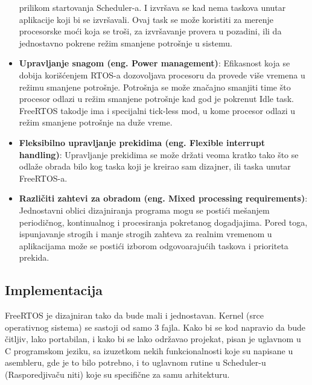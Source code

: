 \documentclass[a4paper,12pt, master]{etf}
\begin{document}
\begin{itemize}
        prilikom startovanja Scheduler-a. I izvr\v{s}ava se kad nema taskova
        unutar aplikacije koji bi se izvr\v{s}avali. Ovaj task se mo\v{z}e
        koristiti za merenje procesorske mo\'{c}i koja se tro\v{s}i, za
        izvr\v{s}avanje provera u pozadini, ili da jednostavno pokrene re\v{z}im
        smanjene potro\v{s}nje u sistemu.
        \item \textbf{Upravljanje snagom (eng\@. Power management)}: Efikasnost koja se
        dobija kori\v{s}\'{c}enjem RTOS-a dozovoljava procesoru da provede
        vi\v{s}e vremena u re\v{z}imu smanjene potro\v{s}nje. Potro\v{s}nja se
        mo\v{z}e zna\v{c}ajno smanjiti time \v{s}to procesor odlazi u re\v{z}im
        smanjene potro\v{s}nje kad god je pokrenut Idle task. FreeRTOS takodje
        ima i specijalni tick-less mod, u kome procesor odlazi u re\v{z}im
        smanjene potro\v{s}nje na du\v{z}e vreme.
        \item \textbf{Fleksibilno upravljanje prekidima (eng\@. Flexible interrupt
        handling)}: Upravljanje prekidima se mo\v{z}e dr\v{z}ati veoma kratko
        tako \v{s}to se odla\v{z}e obrada bilo kog taska koji je kreirao sam
        dizajner, ili taska unutar FreeRTOS-a.
        \item \textbf{Razli\v{c}iti zahtevi za obradom (eng\@. Mixed processing
        requirements)}: Jednostavni oblici dizajniranja programa mogu se
        posti\'{c}i me\v{s}anjem periodi\v{c}nog, kontinualnog i procesiranja
        pokretanog dogadjajima. Pored toga, ispunjavanje strogih i manje strogih
        zahteva za realnim vremenom u aplikacijama mo\v{z}e se posti\'{c}i
        izborom odgovoaraju\'{c}ih taskova i prioriteta prekida.

	\end{itemize}

	\subsection{Implementacija}

	FreeRTOS je dizajniran tako da bude mali i jednostavan. Kernel (srce
	operativnog sistema) se sastoji od samo 3 fajla. Kako bi se kod napravio da
	bude \v{c}itljiv, lako portabilan, i kako bi se lako odr\v{z}avao projekat,
	pisan je uglavnom u C programskom jeziku, sa izuzetkom nekih
	funkcionalnosti koje su napisane u asembleru, gde je to bilo potrebno, i to
	uglavnom rutine u Scheduler-u (Rasporedjiva\v{c}u niti) koje su
	specifi\v{c}ne za samu arhitekturu.
\end{document}
